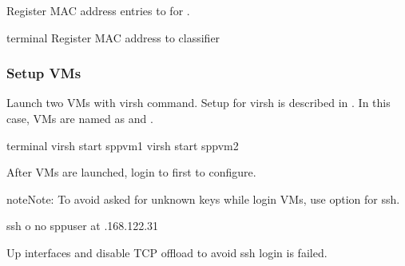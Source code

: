 \documentclass[a4paper,11pt,openany,oneside,english]{sphinxmanual}
\begin{document}
Register MAC address entries to  for .

\begin{sphinxVerbatim}[commandchars=\\\{\},formatcom=\footnotesize]
 terminal 
 Register MAC address to classifier
\end{sphinxVerbatim}


\subsubsection{Setup VMs}
\label{\detokenize{usecases/spp_vf:setup-vms}}\label{\detokenize{usecases/spp_vf:spp-usecases-vf-ssh-setup-vms}}
Launch two VMs with virsh command.
Setup for virsh is described in {\hyperref[\detokenize{gsg/howto_use:spp-gsg-howto-virsh}]{}}.
In this case, VMs are named as  and .

\begin{sphinxVerbatim}[commandchars=\\\{\},formatcom=\footnotesize]
 terminal 
 virsh start spp\PYGZhy{}vm1  
 virsh start spp\PYGZhy{}vm2  
\end{sphinxVerbatim}

After VMs are launched, login to  first to configure.

\begin{sphinxadmonition}{note}{Note:}
To avoid asked for unknown keys while login VMs, use
 option for ssh.

\begin{sphinxVerbatim}[commandchars=\\\{\},formatcom=\footnotesize]
 ssh \PYGZhy{}o no sppuser at .168.122.31
\end{sphinxVerbatim}
\end{sphinxadmonition}

Up interfaces and disable TCP offload to avoid ssh login is failed.
\end{document}
